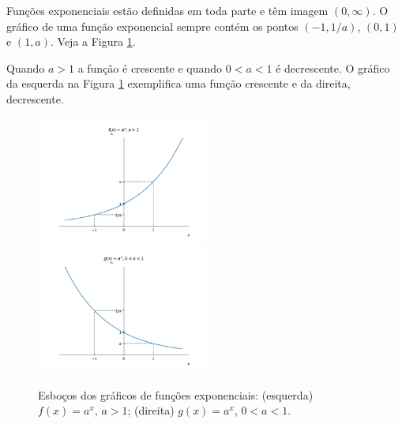 \documentclass[../main.tex]{subfiles}
\begin{document}
Funções exponenciais estão definidas em toda parte e têm imagem $(0, \infty)$. O gráfico de uma função exponencial sempre contém os pontos $(-1,1/a)$, $(0,1)$ e $(1,a)$. Veja a Figura \ref{fig:GrafExp}.

Quando $a>1$ a função é crescente e quando $0<a<1$ é decrescente. O gráfico da esquerda na Figura \ref{fig:GrafExp} exemplifica uma função crescente e da direita, decrescente.
\begin{figure}[H]
  \centering
  \includegraphics[width=0.5\textwidth]{fig_func/fig_exponencial_2}~
  \includegraphics[width=0.5\textwidth]{fig_func/fig_exponencial_12}
  \caption{Esboços dos gráficos de funções exponenciais: (esquerda) $f(x) = a^x$, $a>1$; (direita) $g(x) = a^x$, $0<a<1$.}
  \label{fig:GrafExp}
\end{figure}
\end{document}
